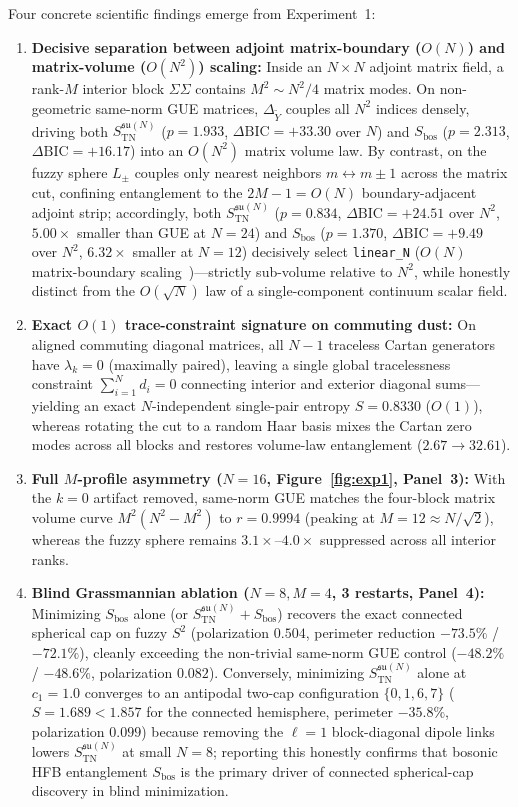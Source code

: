 \documentclass[11pt,a4paper]{article}
\begin{document}
Four concrete scientific findings emerge from Experiment~1:
\begin{enumerate}
  \item \textbf{Decisive separation between adjoint matrix-boundary ($O(N)$) and matrix-volume ($O(N^2)$) scaling:} Inside an $N\times N$ adjoint matrix field, a rank-$M$ interior block $\Sigma\Sigma$ contains $M^2 \sim N^2/4$ matrix modes. On non-geometric same-norm GUE matrices, $\Delta_{\tilde{Y}}$ couples all $N^2$ indices densely, driving both $S_{\mathrm{TN}}^{\mathfrak{su}(N)}$ ($p = 1.933$, $\Delta\mathrm{BIC}=+33.30$ over $N$) and $S_{\mathrm{bos}}$ ($p = 2.313$, $\Delta\mathrm{BIC}=+16.17$) into an $O(N^2)$ matrix volume law. By contrast, on the fuzzy sphere $L_\pm$ couples only nearest neighbors $m \leftrightarrow m\pm 1$ across the matrix cut, confining entanglement to the $2M-1 = O(N)$ boundary-adjacent adjoint strip; accordingly, both $S_{\mathrm{TN}}^{\mathfrak{su}(N)}$ ($p = 0.834$, $\Delta\mathrm{BIC}=+24.51$ over $N^2$, $5.00\times$ smaller than GUE at $N=24$) and $S_{\mathrm{bos}}$ ($p = 1.370$, $\Delta\mathrm{BIC}=+9.49$ over $N^2$, $6.32\times$ smaller at $N=12$) decisively select \texttt{linear\_N} ($O(N)$ matrix-boundary scaling~\cite{Fliss2025})—strictly sub-volume relative to $N^2$, while honestly distinct from the $O(\sqrt{N})$ law of a single-component continuum scalar field.
  \item \textbf{Exact $O(1)$ trace-constraint signature on commuting dust:} On aligned commuting diagonal matrices, all $N-1$ traceless Cartan generators have $\lambda_k = 0$ (maximally paired), leaving a single global tracelessness constraint $\sum_{i=1}^N d_i = 0$ connecting interior and exterior diagonal sums—yielding an exact $N$-independent single-pair entropy $S = 0.8330$ ($O(1)$), whereas rotating the cut to a random Haar basis mixes the Cartan zero modes across all blocks and restores volume-law entanglement ($2.67 \to 32.61$).
  \item \textbf{Full $M$-profile asymmetry ($N=16$, Figure~\ref{fig:exp1}, Panel~3):} With the $k=0$ artifact removed, same-norm GUE matches the four-block matrix volume curve $M^2(N^2-M^2)$ to $r = 0.9994$ (peaking at $M=12 \approx N/\sqrt{2}$), whereas the fuzzy sphere remains $3.1\times$--$4.0\times$ suppressed across all interior ranks.
  \item \textbf{Blind Grassmannian ablation ($N=8, M=4$, 3 restarts, Panel~4):} Minimizing $S_{\mathrm{bos}}$ alone (or $S_{\mathrm{TN}}^{\mathfrak{su}(N)} + S_{\mathrm{bos}}$) recovers the exact connected spherical cap on fuzzy $S^2$ (polarization $0.504$, perimeter reduction $-73.5\%$ / $-72.1\%$), cleanly exceeding the non-trivial same-norm GUE control ($-48.2\%$ / $-48.6\%$, polarization $0.082$). Conversely, minimizing $S_{\mathrm{TN}}^{\mathfrak{su}(N)}$ alone at $c_1=1.0$ converges to an antipodal two-cap configuration $\{0,1,6,7\}$ ($S = 1.689 < 1.857$ for the connected hemisphere, perimeter $-35.8\%$, polarization $0.099$) because removing the $\ell=1$ block-diagonal dipole links lowers $S_{\mathrm{TN}}^{\mathfrak{su}(N)}$ at small $N=8$; reporting this honestly confirms that bosonic HFB entanglement $S_{\mathrm{bos}}$ is the primary driver of connected spherical-cap discovery in blind minimization.

\end{enumerate}
\end{document}
